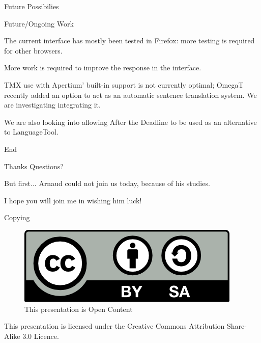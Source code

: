 \documentclass{beamer}
\begin{document}
\begin{section}{Future Possibilies}
\begin{frame}{Future/Ongoing Work}

The current interface has mostly been tested in Firefox: more
testing is required for other browsers.

More work is required to improve the response in the interface.

TMX use with Apertium' built-in support is not currently optimal; OmegaT
recently added an option to act as an automatic sentence translation system. 
We are investigating integrating it.

We are also looking into allowing After the Deadline to be used as an
alternative to LanguageTool.
\end{frame}
\end{section}

\begin{section}{End}
\begin{frame}{Thanks}
Questions?
\end{frame}

\begin{frame}{But first...}
Arnaud could not join us today, because of his studies. 

I hope you will join me in wishing him luck!
\end{frame}

\begin{frame}{Copying}
\begin{figure}
  \caption{This presentation is Open Content}
     \includegraphics[width=\textwidth]{by-sa.png}
\end{figure}

This presentation is licensed under the Creative Commons Attribution 
Share-Alike 3.0 Licence.

\end{frame}

\end{section}
\end{document}
